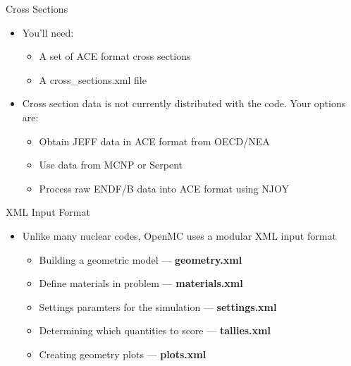 \documentclass[serif]{beamer}
\begin{document}

\begin{frame}{Cross Sections}
  \begin{itemize}
  \item<1-> You'll need:
    \begin{itemize}
    \vfill
    \item<1-> A set of ACE format cross sections
    \vfill
    \item<1-> A cross\_sections.xml file
    \vfill
    \end{itemize}
  \vfill
  \item<1-> Cross section data is not currently distributed with the code. Your
    options are:
    \begin{itemize}
    \vfill
    \item<1-> Obtain JEFF data in ACE format from OECD/NEA
    \vfill
    \item<1-> Use data from MCNP or Serpent
    \vfill
    \item<1-> Process raw ENDF/B data into ACE format using NJOY
    \vfill
    \end{itemize}
  \end{itemize}
\end{frame}


\begin{frame}{XML Input Format}
  \begin{itemize}
  \item<1-> Unlike many nuclear codes, OpenMC uses a modular XML input format
    \begin{itemize}
    \vfill
    \item<1-> Building a geometric model --- \textbf{geometry.xml}
    \vfill
    \item<1-> Define materials in problem --- \textbf{materials.xml}
    \vfill
    \item<1-> Settings paramters for the simulation --- \textbf{settings.xml}
    \vfill
    \item<1-> Determining which quantities to score --- \textbf{tallies.xml}
    \vfill
    \item<1-> Creating geometry plots --- \textbf{plots.xml}
    \vfill
    \end{itemize}
  \end{itemize}
\end{frame}
\end{document}
